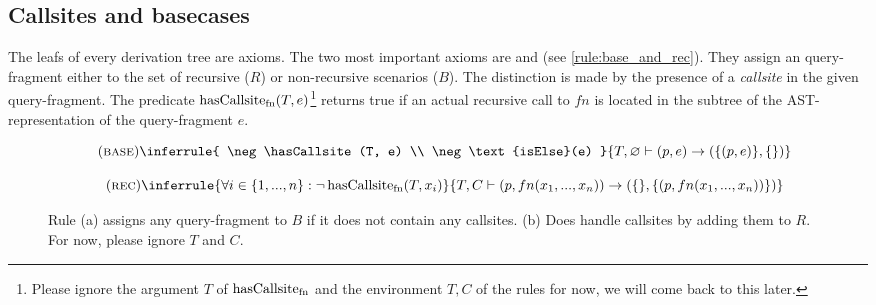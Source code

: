 \subsection{Callsites and basecases}

The leafs of every derivation tree are axioms. The two most important axioms are \RREC and \RBASE (see \autoref{rule:base_and_rec}). They assign an query-fragment either to the set of recursive ($R$) or non-recursive scenarios ($B$). The distinction is made by the presence of a \textit{callsite} in the given query-fragment. The predicate $\operatorname{\text{hasCallsite}_{fn}}(T, e)$\footnote{Please ignore the argument $T$ of $\operatorname{\text{hasCallsite}_{fn}}$ and the environment $T, C$ of the rules for now, we will come back to this later.} returns true if an actual recursive call to $fn$ is located in the subtree of the AST-representation of the query-fragment $e$.


\begin{figure}[h]\small
    \begin{minipage}[b]{.5\linewidth}
    \centering %
$$\quad(\textsc{base})\inferrule{
   \neg \hasCallsite(T, e) \\
   \neg \text{isElse}(e)
}{
    T, \varnothing \vdash (p, e) \rightarrow (\{(p, e)\},\{\})
}$$
    \subcaption{}\label{rule:base}
    \end{minipage}\hfill
    \begin{minipage}[b]{.5\linewidth}
    \centering %
$$\quad(\textsc{rec})\inferrule{
   \forall i \in \{1, ..., n\} : \neg \hasCallsite(T, x_i)
}{
    T, C \vdash (p, fn(x_1, ..., x_n)) \rightarrow (\{\}, \{(p, fn(x_1, ..., x_n))\})
}$$
    \subcaption{}\label{rule:rec}
    \end{minipage}
    \caption{Rule (a) assigns any query-fragment to $B$ if it does not contain any callsites. (b) Does handle callsites by adding them to $R$. For now, please ignore $T$ and $C$.}\label{rule:base_and_rec}
\end{figure}

